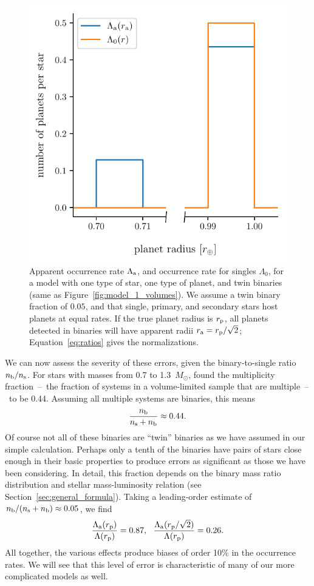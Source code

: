 \documentclass[12pt,modern]{aastex61}
\renewcommand{\a}{_{\rm a}}
\newcommand{\s}{_{\rm s}}
\newcommand{\p}{_{\rm p}}
\renewcommand{\b}{_{\rm b}}
\begin{document}
\begin{figure}[!tb]
    \begin{center}
        \includegraphics[width=.6\textwidth]{figures/occ_rate_vs_radius_model_1_brokenx.pdf}
    \end{center}
    \vspace{-0.5cm}
    \caption{
        Apparent occurrence rate $\Lambda\a$, and occurrence rate for
        singles $\Lambda_0$, for a model with one type of star, one
        type of planet, and twin binaries (same as
        Figure~\ref{fig:model_1_volumes}).  We assume a twin binary
        fraction of $0.05$, and that single, primary, and secondary
        stars host planets at equal rates.  If the true planet radius
        is $r\p$, all planets detected in binaries will have apparent
        radii $r\a = r\p/\sqrt{2}$; Equation~\ref{eq:ratios} gives the
        normalizations.
    }
    \label{fig:occ_rate_model_1}
\end{figure}

We can now assess the severity of these errors, given the
binary-to-single ratio $n\b/n\s$. For stars with masses from 0.7 to
1.3~$M_\odot$, \citet{raghavan_survey_2010} found the multiplicity
fraction~--~the fraction of systems in a volume-limited sample that
are multiple~--~to be 0.44.  Assuming all multiple systems are
binaries, this means
\begin{equation}
    \frac{n\b}{n\s + n\b} \approx 0.44.
\end{equation}
Of course not all of these binaries are ``twin'' binaries as we have
assumed in our simple calculation. Perhaps only a tenth of the
binaries have pairs of stars close enough in their basic properties to
produce errors as significant as those we have been considering. In
detail, this fraction depends on the binary mass ratio distribution
and stellar mass-luminosity relation (see
Section~\ref{sec:general_formula}).  Taking a leading-order estimate
of $n\b/(n\s+n\b)\approx0.05$, we find
\begin{equation}
    \frac{\Lambda\a(r\p)}{\Lambda(r\p)} = 0.87,~~
    \frac{\Lambda\a(r\p/\sqrt{2})}{\Lambda(r\p)} = 0.26.
    \label{eq:ratios}
\end{equation}
All together, the various effects produce biases of order 10\% in the
occurrence rates.  We will see that this level of error is
characteristic of many of our more complicated models as well.
\end{document}
